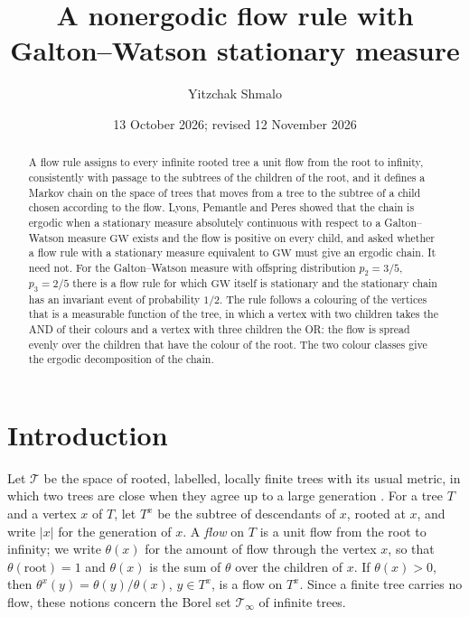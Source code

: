 \documentclass[11pt]{amsart}
\title[A nonergodic flow rule]{A nonergodic flow rule with Galton--Watson stationary measure}
\author{Yitzchak Shmalo}
\date{13 October 2026; revised 12 November 2026}
\theoremstyle{remark}
\numberwithin{equation}{section}
\newcommand{\T}{\mathcal T}
\newcommand{\GW}{\mathrm{GW}}
\begin{document}
\begin{abstract}
A flow rule assigns to every infinite rooted tree a unit flow from the root to infinity, consistently with passage to the subtrees of the children of the root, and it defines a Markov chain on the space of trees that moves from a tree to the subtree of a child chosen according to the flow. Lyons, Pemantle and Peres showed that the chain is ergodic when a stationary measure absolutely continuous with respect to a Galton--Watson measure $\GW$ exists and the flow is positive on every child, and asked whether a flow rule with a stationary measure equivalent to $\GW$ must give an ergodic chain. It need not. For the Galton--Watson measure with offspring distribution $p_2=3/5$, $p_3=2/5$ there is a flow rule for which $\GW$ itself is stationary and the stationary chain has an invariant event of probability $1/2$. The rule follows a colouring of the vertices that is a measurable function of the tree, in which a vertex with two children takes the AND of their colours and a vertex with three children the OR: the flow is spread evenly over the children that have the colour of the root. The two colour classes give the ergodic decomposition of the chain.
\end{abstract}
\maketitle

\section{Introduction}

Let $\T$ be the space of rooted, labelled, locally finite trees with its usual metric, in which two trees are close when they agree up to a large generation \cite[Exercise~5.2]{LP}. For a tree $T$ and a vertex $x$ of $T$, let $T^x$ be the subtree of descendants of $x$, rooted at $x$, and write $|x|$ for the generation of $x$. A \emph{flow} on $T$ is a unit flow from the root to infinity; we write $\theta(x)$ for the amount of flow through the vertex $x$, so that $\theta(\text{root})=1$ and $\theta(x)$ is the sum of $\theta$ over the children of $x$. If $\theta(x)>0$, then $\theta^x(y)=\theta(y)/\theta(x)$, $y\in T^x$, is a flow on $T^x$. Since a finite tree carries no flow, these notions concern the Borel set $\T_\infty$ of infinite trees.
\end{document}
